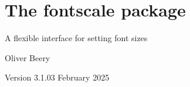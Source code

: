 \documentclass{article}
\begin{document}
\section*{\Large The \textsf{fontscale} package}

A flexible interface for setting font sizes

Oliver Beery

Version 3.1.0\quad{}3 February 2025

\end{document}
